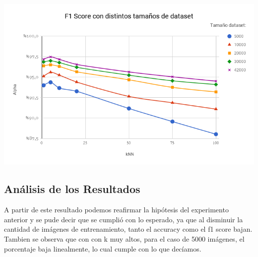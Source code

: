 \begin{center}
   \includegraphics[scale=0.6]{graficos/F1_score_distintos_tamanos.png}
   \label{Fig. 1}
\end{center}

\subsection{Análisis de los Resultados}

A partir de este resultado podemos reafirmar la hipótesis del experimento anterior y se pude decir que se cumplió con lo esperado, ya que al disminuir la cantidad de imágenes de entrenamiento, tanto el accuracy como el f1 score bajan. Tambien se observa que con con k muy altos, para el caso de 5000 imágenes, el porcentaje baja linealmente, lo cual cumple con lo que decíamos.